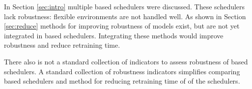 In Section \ref{sec:intro} multiple \rl based schedulers were discussed. These
schedulers lack robustness: flexible environments are not handled well. As
shown in Section \ref{sec:reduce} methods for improving robustness of \rl
models exist, but are not yet integrated in \rl based schedulers. Integrating
these methods would improve robustness and reduce retraining time.

There also is not a standard collection of indicators to assess robustness of
\rl based schedulers. A standard collection of robustness indicators
simplifies comparing \rl based schedulers and method for reducing retraining
time of of the schedulers.




%
%
%
%
%
%
%
%
%
%
%
%

